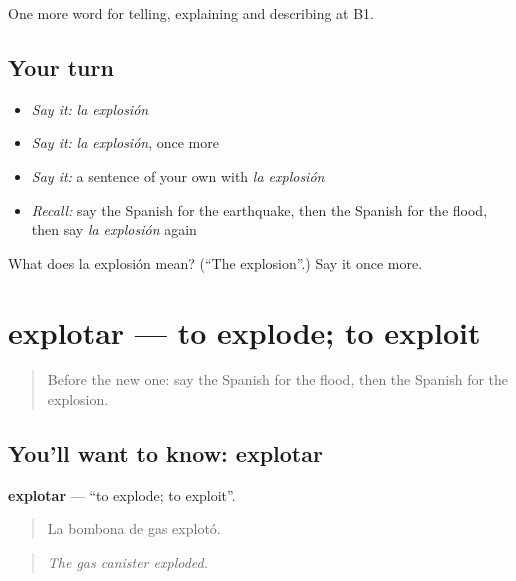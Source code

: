 \begin{grammarlens}[title={What you've built}]
One more word for telling, explaining and describing at B1.
\end{grammarlens}

\subsection*{Your turn}
\begin{itemize}
\raggedright
  \item \emph{Say it:} \emph{la explosión}
  \item \emph{Say it:} \emph{la explosión}, once more
  \item \emph{Say it:} a sentence of your own with \emph{la explosión}
  \item \emph{Recall:} say the Spanish for the earthquake, then the Spanish for the flood, then say \emph{la explosión} again
\end{itemize}

\begin{tcolorbox}[breakable,colback=teal!4,colframe=teal!35!black,title={Before you move on}]
What does la explosión mean? (\textquotedblleft{}The explosion\textquotedblright{}.) Say it once more.
\end{tcolorbox}
\section[explotar]{explotar — to explode; to exploit}

\label{lesson:ES-C529-explotar}



\begin{quote}
Before the new one: say the Spanish for the flood, then the Spanish for the explosion.
\end{quote}

\subsection*{You'll want to know: explotar}
\textbf{explotar} — \textquotedblleft{}to explode; to exploit\textquotedblright{}.

\begin{quote}
La bombona de gas explotó.
\end{quote}

\begin{quote}
\emph{The gas canister exploded.}
\end{quote}

